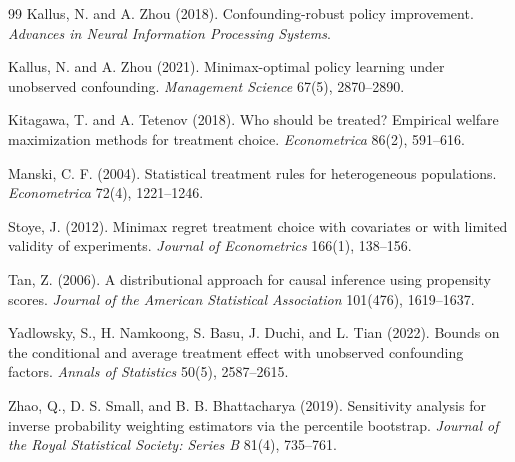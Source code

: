 \documentclass[11pt]{article}
\theoremstyle{definition}
\theoremstyle{plain}
\theoremstyle{remark}
\begin{document}
\begin{thebibliography}{99}
Kallus, N. and A. Zhou (2018).
\newblock Confounding-robust policy improvement.
\newblock \emph{Advances in Neural Information Processing Systems}.

Kallus, N. and A. Zhou (2021).
\newblock Minimax-optimal policy learning under unobserved confounding.
\newblock \emph{Management Science} 67(5), 2870--2890.

Kitagawa, T. and A. Tetenov (2018).
\newblock Who should be treated? Empirical welfare maximization methods for treatment choice.
\newblock \emph{Econometrica} 86(2), 591--616.

Manski, C. F. (2004).
\newblock Statistical treatment rules for heterogeneous populations.
\newblock \emph{Econometrica} 72(4), 1221--1246.

Stoye, J. (2012).
\newblock Minimax regret treatment choice with covariates or with limited validity of experiments.
\newblock \emph{Journal of Econometrics} 166(1), 138--156.

Tan, Z. (2006).
\newblock A distributional approach for causal inference using propensity scores.
\newblock \emph{Journal of the American Statistical Association} 101(476), 1619--1637.

Yadlowsky, S., H. Namkoong, S. Basu, J. Duchi, and L. Tian (2022).
\newblock Bounds on the conditional and average treatment effect with unobserved confounding factors.
\newblock \emph{Annals of Statistics} 50(5), 2587--2615.

Zhao, Q., D. S. Small, and B. B. Bhattacharya (2019).
\newblock Sensitivity analysis for inverse probability weighting estimators via the percentile bootstrap.
\newblock \emph{Journal of the Royal Statistical Society: Series B} 81(4), 735--761.
\end{thebibliography}
\end{document}
